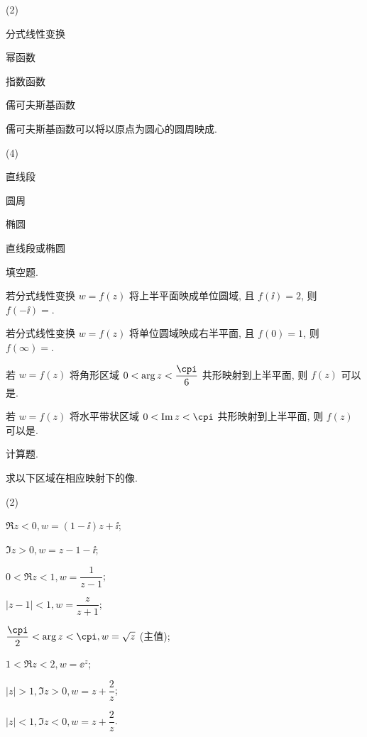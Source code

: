 \begin{homework}
\begin{subex}
    \begin{exchoice}(2)
      \item 分式线性变换
      \item 幂函数
      \item 指数函数
      \item 儒可夫斯基函数
    \end{exchoice}
    \item 儒可夫斯基函数可以将以原点为圆心的圆周映成\fillbrace{}.
    \begin{exchoice}(4)
      \item 直线段
      \item 圆周
      \item 椭圆
      \item 直线段或椭圆
    \end{exchoice}
  \end{subex}
  \item 填空题.
  \begin{subex}
    \item 若分式线性变换 $w=f(z)$ 将上半平面映成单位圆域, 且 $f(\ii)=2$, 则 $f(-\ii)=$\fillblank[7mm]{}.
    \item 若分式线性变换 $w=f(z)$ 将单位圆域映成右半平面, 且 $f(0)=1$, 则 $f(\infty)=$\fillblank[7mm]{}.
    \item 若 $w=f(z)$ 将角形区域 $0<\arg z<\dfrac\cpi6$ 共形映射到上半平面, 则 $f(z)$ 可以是\fillblank{}.
    \item 若 $w=f(z)$ 将水平带状区域 $0<\Im z<\cpi$ 共形映射到上半平面, 则 $f(z)$ 可以是\fillblank{}.
  \end{subex}
  \item 计算题.
  \begin{subex}
    \item 求以下区域在相应映射下的像.
    \begin{subsubex}(2)
      \item $\Re z<0, w=(1-\ii)z+\ii$;
      \item $\Im z>0, w=z-1-\ii$;
      \item $0<\Re z<1, w=\dfrac1{z-1}$;
      \item $|z-1|<1, w=\dfrac z{z+1}$;
      \item $\dfrac\cpi2<\arg z<\cpi, w=\sqrt z$ (主值);
      \item $1<\Re z<2, w=\ee^z$;
      \item $|z|>1, \Im z>0, w=z+\dfrac 2z$;
      \item $|z|<1, \Im z<0, w=z+\dfrac 2z$.
    \end{subsubex}

\end{subex}
\end{homework}
